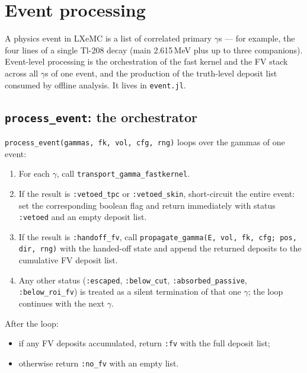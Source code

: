 \documentclass[11pt]{article}
\begin{document}
\section{Event processing}
\label{sec:event}

A physics event in LXeMC is a list of correlated primary $\gamma$s --- for
example, the four lines of a single Tl-208 decay (main 2.615\,MeV plus up to
three companions). Event-level processing is the orchestration of the fast
kernel and the FV stack across all $\gamma$s of one event, and the production
of the truth-level deposit list consumed by offline analysis. It lives in
\texttt{event.jl}.

\subsection{\texttt{process\_event}: the orchestrator}
\label{sec:event-process}

\texttt{process\_event(gammas, fk, vol, cfg, rng)} loops over the gammas of
one event:

\begin{enumerate}[label=\arabic*.]
\item For each $\gamma$, call \texttt{transport\_gamma\_fastkernel}.
\item If the result is \texttt{:vetoed\_tpc} or \texttt{:vetoed\_skin},
short-circuit the entire event: set the corresponding boolean flag and
return immediately with status \texttt{:vetoed} and an empty deposit list.
\item If the result is \texttt{:handoff\_fv}, call
\texttt{propagate\_gamma(E, vol, fk, cfg; pos, dir, rng)} with the handed-off
state and append the returned deposits to the cumulative FV deposit list.
\item Any other status (\texttt{:escaped}, \texttt{:below\_cut},
\texttt{:absorbed\_passive}, \texttt{:below\_roi\_fv}) is treated as a
silent termination of that one $\gamma$; the loop continues with the next
$\gamma$.
\end{enumerate}

After the loop:
\begin{itemize}
\item if any FV deposits accumulated, return \texttt{:fv} with the full
deposit list;
\item otherwise return \texttt{:no\_fv} with an empty list.
\end{itemize}
\end{document}
